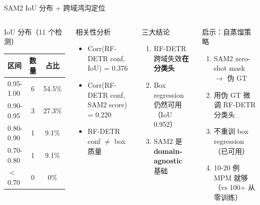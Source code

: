 \documentclass[aspectratio=169, 10pt]{beamer}
\begin{document}
\begin{frame}{SAM2 IoU 分布 + 跨域鸿沟定位}
  \begin{columns}[T]
    \begin{block}{IoU 分布（11 个检测）}
      \scriptsize
      \begin{tabular}{lcc}
        \toprule
        \textbf{区间} & \textbf{数量} & \textbf{占比} \\
        \midrule
        0.95-1.00 & 6 & 54.5\% \\
        0.90-0.95 & 3 & 27.3\% \\
        0.80-0.90 & 1 & 9.1\% \\
        0.70-0.80 & 1 & 9.1\% \\
        $<$0.70 & 0 & 0\% \\
        \bottomrule
      \end{tabular}
    \end{block}
    \begin{block}{相关性分析}
      \begin{itemize}
        \item Corr(RF-DETR conf, IoU) = 0.376
        \item Corr(RF-DETR conf, SAM2 score) = 0.220
        \item RF-DETR conf $\neq$ box 质量
      \end{itemize}
    \end{block}
    \begin{alertblock}{三大结论}
      \begin{enumerate}
        \item RF-DETR 跨域失效\textbf{在分类头}
        \item Box regression 仍然可用（IoU 0.952）
        \item SAM2 是 \textbf{domain-agnostic} 基础
      \end{enumerate}
    \end{alertblock}
    \begin{block}{启示：自蒸馏策略}
      \begin{enumerate}
        \item SAM2 zero-shot mask $\to$ 伪 GT
        \item 用伪 GT 微调 RF-DETR 分类头
        \item 不重训 box regression（已可用）
        \item 10-20 例 MPM 就够（vs 100+ 从零训练）
      \end{enumerate}
    \end{block}
  \end{columns}
\end{frame}
\end{document}
